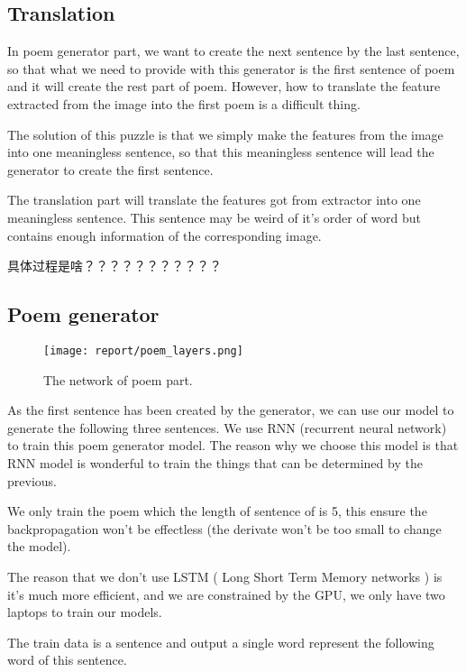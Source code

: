 \documentclass[10pt,twocolumn,letterpaper]{article}
\begin{document}
\subsection{Translation}
In poem generator part, we want to create the next sentence by the last sentence, so that what we need to provide with this generator is the first sentence of poem and it will create the rest part of poem. However, how to translate the feature extracted from the image into the first poem is a difficult thing. 

The solution of this puzzle is that we simply make the features from the image into one meaningless sentence, so that this meaningless sentence will lead the generator to create the first sentence.

The translation part will translate the features got from extractor into one meaningless sentence. This sentence may be weird of it's order of word but contains enough information of the corresponding image.

具体过程是啥？？？？？？？？？？？

\subsection{Poem generator}

\begin{figure}[t]
\begin{center}
   \texttt{[image: report/poem\_layers.png]}
\end{center}
   \caption{The network of poem part.}
\label{fig:poem_layer_network}
\end{figure}

As the first sentence has been created by the generator, we can use our model to generate the following three sentences.
We use RNN (recurrent neural network) to train this poem generator model. The reason why we choose this model is that RNN model is wonderful to train the things that can be determined by the previous. 

We only train the poem which the length of sentence of is 5, this ensure the backpropagation won’t be effectless (the derivate won’t be too small to change the model). 

The reason that we don’t use LSTM ( Long Short Term Memory networks ) is it’s much more efficient, and we are constrained by the GPU, we only have two laptops to train our models. 

The train data is a sentence and output a single word represent the following word of this sentence.
\end{document}
